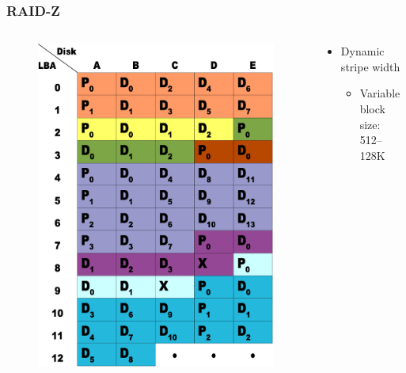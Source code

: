 % 
% 
\begin{frame}[fragile]
    \frametitle{RAID-Z}
      \begin{columns}
      \begin{column}{0.4\textwidth}
        \begin{figure}
        \includegraphics[width=0.8\linewidth]{figs/ZFS-raidz.png}
        \end{figure}
      \end{column}
      \begin{column}{0.6\textwidth}
        \begin{itemize}
            \item Dynamic stripe width
            \begin{itemize}
                \item Variable block size: 512–128K

\end{itemize}
\end{itemize}
\end{column}
\end{columns}
\end{frame}
